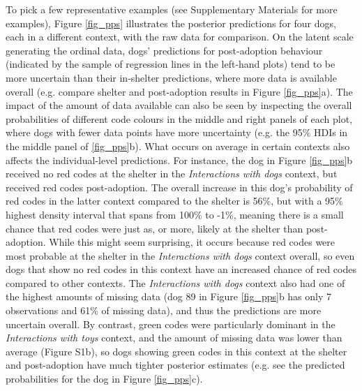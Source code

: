 \documentclass[12pt]{article}
\begin{document}
To pick a few representative examples (see Supplementary Materials for more examples), Figure \ref{fig_pps} illustrates the posterior predictions for four dogs, each in a different context, with the raw data for comparison. On the latent scale generating the ordinal data, dogs' predictions for post-adoption behaviour (indicated by the sample of regression lines in the left-hand plots) tend to be more uncertain than their in-shelter predictions, where more data is available overall (e.g. compare shelter and post-adoption results in Figure \ref{fig_pps}a). The impact of the amount of data available can also be seen by inspecting the overall probabilities of different code colours in the middle and right panels of each plot, where dogs with fewer data points have more uncertainty (e.g. the 95\% HDIs in the middle panel of \ref{fig_pps}b). What occurs on average in certain contexts also affects the individual-level predictions. For instance, the dog in Figure \ref{fig_pps}b received no red codes at the shelter in the \textit{Interactions with dogs} context, but received red codes post-adoption. The overall increase in this dog's probability of red codes in the latter context compared to the shelter is 56\%, but with a 95\% highest density interval that spans from 100\% to -1\%, meaning there is a small chance that red codes were just as, or more, likely at the shelter than post-adoption. While this might seem surprising, it occurs because red codes were most probable at the shelter in the \textit{Interactions with dogs} context overall, so even dogs that show no red codes in this context have an increased chance of red codes compared to other contexts. The \textit{Interactions with dogs} context also had one of the highest amounts of missing data (dog 89 in Figure \ref{fig_pps}b has only 7 observations and 61\% of missing data), and thus the predictions are more uncertain overall. By contrast, green codes were particularly dominant in the \textit{Interactions with toys} context, and the amount of missing data was lower than average (Figure S1b), so dogs showing green codes in this context at the shelter and post-adoption have much tighter posterior estimates (e.g. see the predicted probabilities for the dog in Figure \ref{fig_pps}c).
\end{document}
